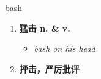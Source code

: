 
\begin{frame}
{\huge bash}
\begin{center}
\begin{enumerate}\Large
  \item \textbf{猛击 n. \& v.}
  \begin{itemize}
    \item \em{\Large{bash on his head}}
  \end{itemize}
  \item \textbf{抨击，严厉批评}
\end{enumerate}
\end{center}
\end{frame}
